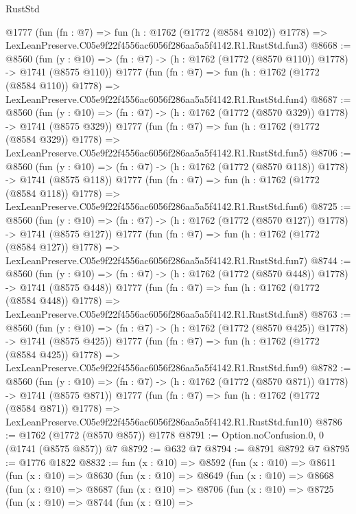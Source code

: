 \begin{lexlean}{RustStd}
\begin{coremodule}
    @1777
    (fun (fn : @7) =>
    fun (h : @1762 (@1772 (@8584 @102)) @1778) =>
    LexLeanPreserve.C05e9f22f4556ac6056f286aa5a5f4142.R1.RustStd.fun3)
@8668 := @8560
    (fun (y : @10) => (fn : @7) -> (h : @1762 (@1772 (@8570 @110)) @1778) -> @1741 (@8575 @110))
    @1777
    (fun (fn : @7) =>
    fun (h : @1762 (@1772 (@8584 @110)) @1778) =>
    LexLeanPreserve.C05e9f22f4556ac6056f286aa5a5f4142.R1.RustStd.fun4)
@8687 := @8560
    (fun (y : @10) => (fn : @7) -> (h : @1762 (@1772 (@8570 @329)) @1778) -> @1741 (@8575 @329))
    @1777
    (fun (fn : @7) =>
    fun (h : @1762 (@1772 (@8584 @329)) @1778) =>
    LexLeanPreserve.C05e9f22f4556ac6056f286aa5a5f4142.R1.RustStd.fun5)
@8706 := @8560
    (fun (y : @10) => (fn : @7) -> (h : @1762 (@1772 (@8570 @118)) @1778) -> @1741 (@8575 @118))
    @1777
    (fun (fn : @7) =>
    fun (h : @1762 (@1772 (@8584 @118)) @1778) =>
    LexLeanPreserve.C05e9f22f4556ac6056f286aa5a5f4142.R1.RustStd.fun6)
@8725 := @8560
    (fun (y : @10) => (fn : @7) -> (h : @1762 (@1772 (@8570 @127)) @1778) -> @1741 (@8575 @127))
    @1777
    (fun (fn : @7) =>
    fun (h : @1762 (@1772 (@8584 @127)) @1778) =>
    LexLeanPreserve.C05e9f22f4556ac6056f286aa5a5f4142.R1.RustStd.fun7)
@8744 := @8560
    (fun (y : @10) => (fn : @7) -> (h : @1762 (@1772 (@8570 @448)) @1778) -> @1741 (@8575 @448))
    @1777
    (fun (fn : @7) =>
    fun (h : @1762 (@1772 (@8584 @448)) @1778) =>
    LexLeanPreserve.C05e9f22f4556ac6056f286aa5a5f4142.R1.RustStd.fun8)
@8763 := @8560
    (fun (y : @10) => (fn : @7) -> (h : @1762 (@1772 (@8570 @425)) @1778) -> @1741 (@8575 @425))
    @1777
    (fun (fn : @7) =>
    fun (h : @1762 (@1772 (@8584 @425)) @1778) =>
    LexLeanPreserve.C05e9f22f4556ac6056f286aa5a5f4142.R1.RustStd.fun9)
@8782 := @8560
    (fun (y : @10) => (fn : @7) -> (h : @1762 (@1772 (@8570 @871)) @1778) -> @1741 (@8575 @871))
    @1777
    (fun (fn : @7) =>
    fun (h : @1762 (@1772 (@8584 @871)) @1778) =>
    LexLeanPreserve.C05e9f22f4556ac6056f286aa5a5f4142.R1.RustStd.fun10)
@8786 := @1762 (@1772 (@8570 @857)) @1778
@8791 := Option.noConfusion.{0, 0} (@1741 (@8575 @857)) @7
@8792 := @632 @7
@8794 := @8791 @8792 @7
@8795 := @1776 @1822
@8832 := fun (x : @10) =>
  @8592
    (fun (x : @10) =>
    @8611
      (fun (x : @10) =>
      @8630
        (fun (x : @10) =>
        @8649
          (fun (x : @10) =>
          @8668
            (fun (x : @10) =>
            @8687
              (fun (x : @10) =>
              @8706
                (fun (x : @10) =>
                @8725
                  (fun (x : @10) =>
                  @8744
                    (fun (x : @10) =>

\end{coremodule}
\end{lexlean}
